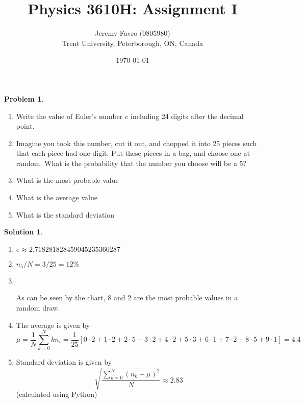 \documentclass[10pt]{article}
\title{Physics 3610H: Assignment I}
\author{Jeremy Favro (0805980) \\ Trent University, Peterborough, ON, Canada}
\date{\today}
\theoremstyle{definition}
\newtheorem{problem}{Problem}
\newtheorem{soln}{Solution}
\begin{document}
\maketitle

\begin{problem}~
\begin{enumerate}[label=(\alph*)]
  \item Write the value of Euler's number $e$ including 24 digits after the decimal point.
  \item Imagine you took this number, cut it out, and chopped it into 25 pieces such that each
        piece had one digit. Put these pieces in a bag, and choose one at random. What is the
        probability that the number you choose will be a 5?
  \item What is the most probable value
  \item What is the average value
  \item What is the standard deviation
\end{enumerate}
\end{problem}
\begin{soln}~
  \begin{enumerate}[label=(\alph*)]
    \item $e\approx \qty{2.718281828459045235360287}{}$
    \item $n_5/N=3/25=12\%$
    \item ~\\\begin{center}
          \end{center}
          As can be seen by the chart, 8 and 2 are the most probable values in a random draw.
    \item The average is given by
          $$\mu=\frac{1}{N}\sum_{k=0}^{N}kn_i=\frac{1}{25}\left[0\cdot2+1\cdot2+2\cdot 5+ 3\cdot 2 +4\cdot 2 +5\cdot 3 +6\cdot 1 +7\cdot 2 +8\cdot 5 +9\cdot 1\right]=4.4$$
    \item Standard deviation is given by 
          $$\sqrt{\frac{\sum_{k=0}^{N}\left(n_k-\mu\right)^2}{N}}\approx 2.83$$
          (calculated using Python)
  \end{enumerate}
\end{soln}
\end{document}
